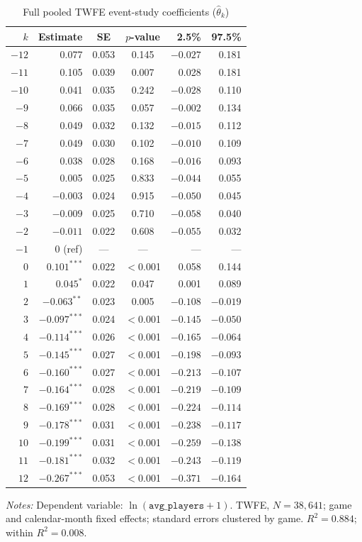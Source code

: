 \documentclass[11pt]{article}
\newcommand{\avgp}{\texttt{avg\_players}}
\begin{document}
\begin{singlespace}
\begin{table}[H]
\centering\small
\caption{Full pooled TWFE event-study coefficients ($\hat{\theta}_k$)}
\label{tab:fullcoefs}
\begin{tabular}{rrccrr}
\toprule
$k$ & Estimate & SE & $p$-value & 2.5\% & 97.5\% \\
\midrule
$-12$ &  0.077 & 0.053 & 0.145 & $-0.027$ & 0.181 \\
$-11$ &  0.105 & 0.039 & 0.007 &    0.028 & 0.181 \\
$-10$ &  0.041 & 0.035 & 0.242 & $-0.028$ & 0.110 \\
$-9$  &  0.066 & 0.035 & 0.057 & $-0.002$ & 0.134 \\
$-8$  &  0.049 & 0.032 & 0.132 & $-0.015$ & 0.112 \\
$-7$  &  0.049 & 0.030 & 0.102 & $-0.010$ & 0.109 \\
$-6$  &  0.038 & 0.028 & 0.168 & $-0.016$ & 0.093 \\
$-5$  &  0.005 & 0.025 & 0.833 & $-0.044$ & 0.055 \\
$-4$  & $-0.003$ & 0.024 & 0.915 & $-0.050$ & 0.045 \\
$-3$  & $-0.009$ & 0.025 & 0.710 & $-0.058$ & 0.040 \\
$-2$  & $-0.011$ & 0.022 & 0.608 & $-0.055$ & 0.032 \\
$-1$  & 0 (ref) & --- & --- & --- & --- \\
\midrule
$0$  & $\mathbf{0.101}^{***}$ & 0.022 & $<$0.001 & 0.058 & 0.144 \\
$1$  & $0.045^{*}$ & 0.022 & 0.047 &  0.001 & 0.089 \\
$2$  & $-0.063^{**}$ & 0.023 & 0.005 & $-0.108$ & $-0.019$ \\
$3$  & $-0.097^{***}$ & 0.024 & $<$0.001 & $-0.145$ & $-0.050$ \\
$4$  & $-0.114^{***}$ & 0.026 & $<$0.001 & $-0.165$ & $-0.064$ \\
$5$  & $-0.145^{***}$ & 0.027 & $<$0.001 & $-0.198$ & $-0.093$ \\
$6$  & $-0.160^{***}$ & 0.027 & $<$0.001 & $-0.213$ & $-0.107$ \\
$7$  & $-0.164^{***}$ & 0.028 & $<$0.001 & $-0.219$ & $-0.109$ \\
$8$  & $-0.169^{***}$ & 0.028 & $<$0.001 & $-0.224$ & $-0.114$ \\
$9$  & $-0.178^{***}$ & 0.031 & $<$0.001 & $-0.238$ & $-0.117$ \\
$10$ & $-0.199^{***}$ & 0.031 & $<$0.001 & $-0.259$ & $-0.138$ \\
$11$ & $-0.181^{***}$ & 0.032 & $<$0.001 & $-0.243$ & $-0.119$ \\
$12$ & $-0.267^{***}$ & 0.053 & $<$0.001 & $-0.371$ & $-0.164$ \\
\bottomrule
\end{tabular}
\medskip

\noindent\small\textit{Notes:} Dependent variable: $\ln(\avgp+1)$.
  TWFE, $N = 38{,}641$; game and calendar-month fixed effects;
  standard errors clustered by game.
  $R^2 = 0.884$; within $R^2 = 0.008$.
\end{table}

\end{singlespace}
\end{document}

